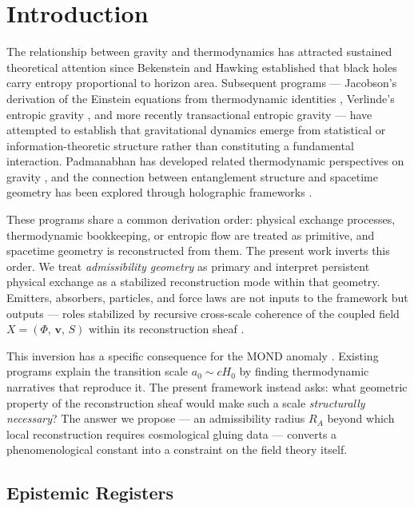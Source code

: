 \documentclass[11pt, a4paper]{article}
\theoremstyle{plain}
\theoremstyle{definition}
\theoremstyle{remark}
\newcommand{\Xfield}{X = (\Phi,\,\mathbf{v},\,S)}
\newcommand{\RA}{R_{\!A}}
\begin{document}
\section{Introduction}

The relationship between gravity and thermodynamics has attracted sustained
theoretical attention since Bekenstein and Hawking established that black holes carry
entropy proportional to horizon area. Subsequent programs --- Jacobson's derivation
of the Einstein equations from thermodynamic identities \cite{jacobson1995,jacobson2016},
Verlinde's entropic gravity \cite{verlinde2011,verlinde2017}, and more recently
transactional entropic gravity \cite{kastner2024} --- have attempted to establish
that gravitational dynamics emerge from statistical or information-theoretic structure
rather than constituting a fundamental interaction. Padmanabhan has developed related
thermodynamic perspectives on gravity \cite{padmanabhan2010}, and the connection
between entanglement structure and spacetime geometry has been explored through
holographic frameworks \cite{vanraamsdonk2010,swingle2012}.

These programs share a common derivation order: physical exchange processes,
thermodynamic bookkeeping, or entropic flow are treated as primitive, and spacetime
geometry is reconstructed from them. The present work inverts this order. We treat
\emph{admissibility geometry} as primary and interpret persistent physical exchange
as a stabilized reconstruction mode within that geometry. Emitters, absorbers,
particles, and force laws are not inputs to the framework but outputs --- roles
stabilized by recursive cross-scale coherence of the coupled field $\Xfield$ within
its reconstruction sheaf \cite{bredon1997,maclane1992}.

This inversion has a specific consequence for the MOND anomaly
\cite{milgrom1983,famaey2012}. Existing programs explain the transition scale
$a_0 \sim cH_0$ by finding thermodynamic narratives that reproduce it. The present
framework instead asks: what geometric property of the reconstruction sheaf would
make such a scale \emph{structurally necessary}? The answer we propose --- an
admissibility radius $\RA$ beyond which local reconstruction requires cosmological
gluing data --- converts a phenomenological constant into a constraint on the field
theory itself.

\subsection*{Epistemic Registers}
\end{document}
